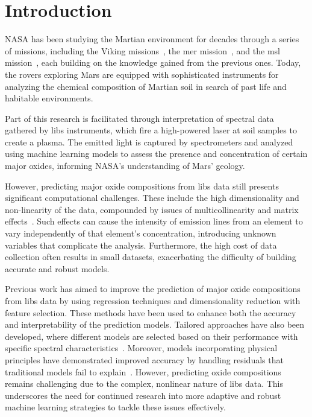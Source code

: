 \section{Introduction}\label{sec:introduction}
NASA has been studying the Martian environment for decades through a series of missions, including the Viking missions~\cite{marsnasagov_vikings}, the \gls{mer} mission~\cite{marsnasagov_observer, marsnasagov_spirit_opportunity}, and the \gls{msl} mission~\cite{marsnasagov_msl}, each building on the knowledge gained from the previous ones.
Today, the rovers exploring Mars are equipped with sophisticated instruments for analyzing the chemical composition of Martian soil in search of past life and habitable environments.

Part of this research is facilitated through interpretation of spectral data gathered by \gls{libs} instruments, which fire a high-powered laser at soil samples to create a plasma.
The emitted light is captured by spectrometers and analyzed using machine learning models to assess the presence and concentration of certain major oxides, informing NASA's understanding of Mars' geology.

However, predicting major oxide compositions from \gls{libs} data still presents significant computational challenges.
These include the high dimensionality and non-linearity of the data, compounded by issues of multicollinearity and matrix effects~\cite{andersonImprovedAccuracyQuantitative2017}.
Such effects can cause the intensity of emission lines from an element to vary independently of that element's concentration, introducing unknown variables that complicate the analysis.
Furthermore, the high cost of data collection often results in small datasets, exacerbating the difficulty of building accurate and robust models.

Previous work has aimed to improve the prediction of major oxide compositions from \gls{libs} data by using regression techniques and dimensionality reduction with feature selection.
These methods have been used to enhance both the accuracy and interpretability of the prediction models.
Tailored approaches have also been developed, where different models are selected based on their performance with specific spectral characteristics~\cite{rezaei_dimensionality_reduction, andersonPostlandingMajorElement2022}.
Moreover, models incorporating physical principles have demonstrated improved accuracy by handling residuals that traditional models fail to explain~\cite{song_DF-K-ELM}.
However, predicting oxide compositions remains challenging due to the complex, nonlinear nature of \gls{libs} data.
This underscores the need for continued research into more adaptive and robust machine learning strategies to tackle these issues effectively.

